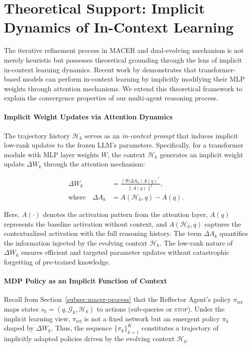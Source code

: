 \section{Theoretical Support: Implicit Dynamics of In-Context Learning}
\label{appendix:theory_support}

The iterative refinement process in MACER and dual-evolving mechanism is not merely heuristic but possesses theoretical grounding through the lens of implicit in-context learning dynamics. Recent work by \citep{dherin2025learning} demonstrates that transformer-based models can perform in-context learning by implicitly modifying their MLP weights through attention mechanisms. We extend this theoretical framework to explain the convergence properties of our multi-agent reasoning process.

\paragraph{Implicit Weight Updates via Attention Dynamics}
The trajectory history $\mathcal{H}_k$ serves as an \emph{in-context prompt} that induces implicit low-rank updates to the frozen LLM's parameters. Specifically, for a transformer module with MLP layer weights $W$, the context $\mathcal{H}_k$ generates an implicit weight update $\Delta W_k$ through the attention mechanism:

\begin{align}
    \Delta W_k &= \frac{(W \Delta A_k) A(q)^\top}{\|A(q)\|^2}, \nonumber \\
    \text{where} \quad \Delta A_k &= A(\mathcal{H}_k, q) - A(q). \label{eq:delta_W}
\end{align}

Here, $A(\cdot)$ denotes the activation pattern from the attention layer, $A(q)$ represents the baseline activation without context, and $A(\mathcal{H}_k, q)$ captures the contextualized activation with the full reasoning history. The term $\Delta A_k$ quantifies the information injected by the evolving context $\mathcal{H}_k$.
The low-rank nature of $\Delta W_k$ ensures efficient and targeted parameter updates without catastrophic forgetting of pre-trained knowledge.

\paragraph{MDP Policy as an Implicit Function of Context}
Recall from Section~\ref{subsec:macer-process} that the Reflector Agent’s policy $\pi_{\text{ref}}$ maps states $s_k = (q, \mathcal{G}_k, \mathcal{H}_k)$ to actions (sub-queries or \textsc{stop}). Under the implicit learning view, $\pi_{\text{ref}}$ is not a fixed network but an emergent policy $\pi_k$ shaped by $\Delta W_k$. Thus, the sequence $\{\pi_k\}_{k=1}^K$ constitutes a trajectory of implicitly adapted policies driven by the evolving context $\mathcal{H}_k$.

